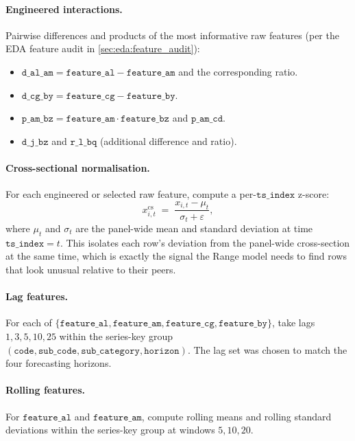 \paragraph{Engineered interactions.}
Pairwise differences and products of the most informative raw features (per the EDA feature audit in \cref{sec:eda:feature_audit}):
\begin{itemize}
  \item $\mathtt{d\_al\_am} = \mathtt{feature\_al} - \mathtt{feature\_am}$ and the corresponding ratio.
  \item $\mathtt{d\_cg\_by} = \mathtt{feature\_cg} - \mathtt{feature\_by}$.
  \item $\mathtt{p\_am\_bz} = \mathtt{feature\_am} \cdot \mathtt{feature\_bz}$ and $\mathtt{p\_am\_cd}$.
  \item $\mathtt{d\_j\_bz}$ and $\mathtt{r\_l\_bq}$ (additional difference and ratio).
\end{itemize}

\paragraph{Cross-sectional normalisation.}
For each engineered or selected raw feature, compute a per-$\mathtt{ts\_index}$ z-score:
\[
  x^{\text{cs}}_{i,t} \;=\; \frac{x_{i,t} - \mu_t}{\sigma_t + \varepsilon},
\]
where $\mu_t$ and $\sigma_t$ are the panel-wide mean and standard deviation at time $\mathtt{ts\_index} = t$. This isolates each row's deviation from the panel-wide cross-section at the same time, which is exactly the signal the Range model needs to find rows that look unusual relative to their peers.

\paragraph{Lag features.}
For each of $\{\mathtt{feature\_al}, \mathtt{feature\_am}, \mathtt{feature\_cg}, \mathtt{feature\_by}\}$, take lags $1, 3, 5, 10, 25$ within the series-key group $(\mathtt{code}, \mathtt{sub\_code}, \mathtt{sub\_category}, \mathtt{horizon})$. The lag set was chosen to match the four forecasting horizons.

\paragraph{Rolling features.}
For $\mathtt{feature\_al}$ and $\mathtt{feature\_am}$, compute rolling means and rolling standard deviations within the series-key group at windows $5, 10, 20$.

